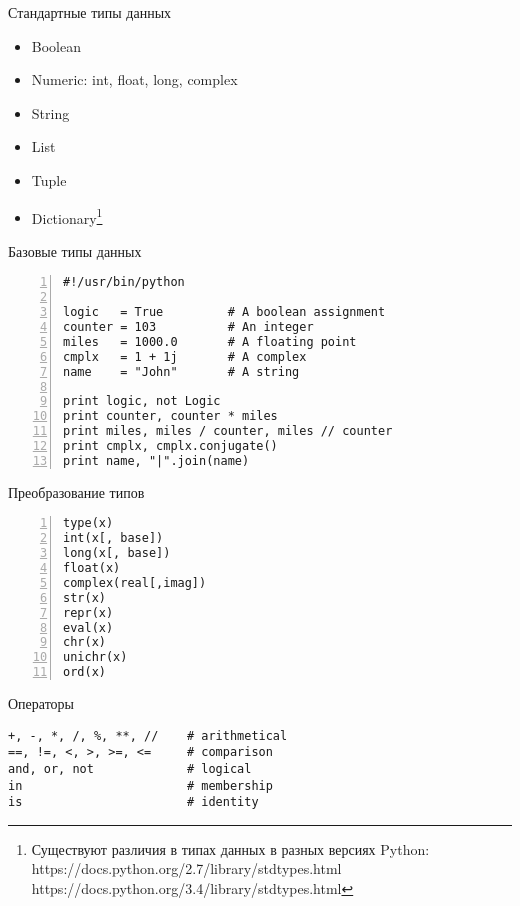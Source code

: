 \documentclass[hyperref={pdftex,unicode}]{beamer}
\begin{document}
\begin{frame}{Стандартные типы данных}
  \begin{itemize}
    \item Boolean
    \item Numeric: int, float, long, complex
    \item String
    \item List
    \item Tuple
    \item Dictionary\footnote[frame]{
        Существуют различия в типах данных в разных версиях Python: \\
        https://docs.python.org/2.7/library/stdtypes.html \\
        https://docs.python.org/3.4/library/stdtypes.html}
  \end{itemize}
\end{frame}

\begin{frame}[fragile]{Базовые типы данных}
  \begin{lstlisting}[numbers=left]
#!/usr/bin/python

logic   = True         # A boolean assignment
counter = 103          # An integer 
miles   = 1000.0       # A floating point
cmplx   = 1 + 1j       # A complex 
name    = "John"       # A string

print logic, not Logic
print counter, counter * miles
print miles, miles / counter, miles // counter
print cmplx, cmplx.conjugate()
print name, "|".join(name)
\end{lstlisting}
\end{frame}

\begin{frame}[fragile]{Преобразование типов}
  \begin{lstlisting}[numbers=left]
type(x)
int(x[, base])
long(x[, base])
float(x)
complex(real[,imag])
str(x)
repr(x)
eval(x)
chr(x)
unichr(x)
ord(x)
\end{lstlisting}
\end{frame}

\begin{frame}[fragile]{Операторы}
\begin{lstlisting}
+, -, *, /, %, **, //    # arithmetical
==, !=, <, >, >=, <=     # comparison
and, or, not             # logical
in                       # membership
is                       # identity
\end{lstlisting}
\end{frame}
\end{document}
